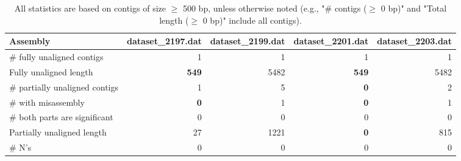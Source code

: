 \documentclass[12pt,a4paper]{article}
\begin{document}
\begin{table}[ht]
\begin{center}
\caption{All statistics are based on contigs of size $\geq$ 500 bp, unless otherwise noted (e.g., "\# contigs ($\geq$ 0 bp)" and "Total length ($\geq$ 0 bp)" include all contigs).}
\begin{tabular}{|l*{4}{|r}|}
\hline
Assembly & dataset\_2197.dat & dataset\_2199.dat & dataset\_2201.dat & dataset\_2203.dat \\ \hline
\# fully unaligned contigs & 1 & 1 & 1 & 1 \\ \hline
Fully unaligned length & {\bf 549} & 5482 & {\bf 549} & 5482 \\ \hline
\# partially unaligned contigs & 1 & 5 & {\bf 0} & 2 \\ \hline
\hspace{5mm}\# with misassembly & {\bf 0} & 1 & {\bf 0} & 1 \\ \hline
\hspace{5mm}\# both parts are significant & 0 & 0 & 0 & 0 \\ \hline
Partially unaligned length & 27 & 1221 & {\bf 0} & 815 \\ \hline
\# N's & 0 & 0 & 0 & 0 \\ \hline
\end{tabular}
\end{center}
\end{table}
\end{document}
